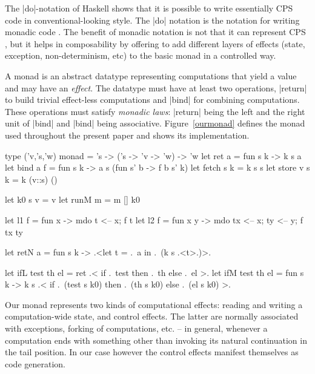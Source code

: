 \documentclass{llncs}
\begin{document}
The |do|-notation of Haskell \cite{Haskell98Report} shows that it is possible
to write essentially CPS code in conventional-looking style. The
|do| notation is the notation for writing monadic code \cite{moggi-notions}.
The benefit of monadic notation is not that it can represent CPS \cite{Filinski:Representing}, but it helps in composability by offering to add different
layers of effects (state, exception, non-determinism, etc) to the
basic monad \cite{liang-interpreter} in a controlled way.

A monad \cite{moggi-notions} is an abstract datatype representing
computations that yield a value and may have an \emph{effect}.
The datatype must have at least two operations, |return| to build
trivial effect-less computations and |bind| for combining
computations. These operations must satisfy \emph{monadic laws}:
|return| being the left and the right unit of |bind| and |bind| being
associative. Figure~\ref{ourmonad} defines the monad used throughout
the present paper and shows its implementation.

\begin{figure*}\label{ourmonad}
\begin{code}
type ('v,'s,'w) monad = 's -> ('s -> 'v -> 'w) -> 'w
let ret a = fun s k -> k s a
let bind a f = fun s k -> a s (fun s' b -> f b s' k)
let fetch s k = k s s
let store v s k = k (v::s) ()

let k0 s v = v
let runM m = m [] k0

let l1 f = fun x -> mdo { t <-- x; f t}
let l2 f = fun x y -> mdo { tx <-- x; ty <-- y; f tx ty}

let retN a = fun s k -> .<let t = .~a in .~(k s .<t>.)>.

let ifL test th el = ret .< if .~test then .~th else .~el >.
let ifM test th el = fun s k ->
  k s .< if .~(test s k0) then .~(th s k0) else .~(el s k0) >.
\end{code}
\caption{Our monad}
\end{figure*}

Our monad represents two kinds of computational effects: reading and
writing a computation-wide state, and control effects. The latter are
normally associated with exceptions, forking of computations, etc. --
in general, whenever a computation ends with something other than
invoking its natural continuation in the tail position. In our case
however the control effects manifest themselves as code generation.
\end{document}
